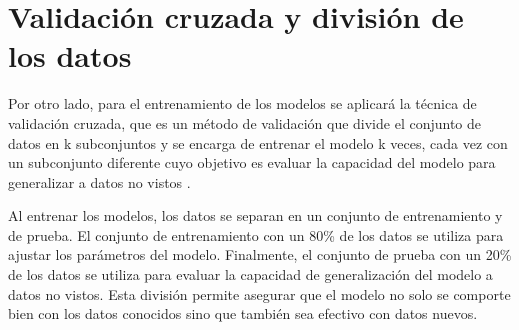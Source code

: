 \section{Validación cruzada y división de los datos}
Por otro lado, para el entrenamiento de los modelos se aplicará la técnica de validación cruzada, que es un método de validación que divide el conjunto de datos en k subconjuntos y se encarga de entrenar el modelo k veces, cada vez con un subconjunto diferente cuyo objetivo es evaluar la capacidad del modelo para generalizar a datos no vistos \cite{validacion-cruzada}.

Al entrenar los modelos, los datos se separan en un conjunto de entrenamiento y de prueba. El conjunto de entrenamiento con un 80\% de los datos se utiliza para ajustar los parámetros del modelo. Finalmente, el conjunto de prueba con un 20\% de los datos se utiliza para evaluar la capacidad de generalización del modelo a datos no vistos. Esta división permite asegurar que el modelo no solo se comporte bien con los datos conocidos sino que también sea efectivo con datos nuevos.


